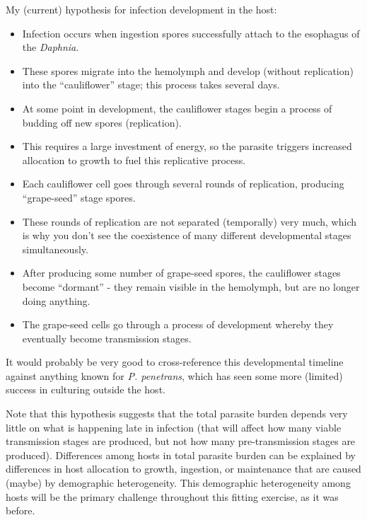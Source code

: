 \documentclass[11pt,reqno,final,pdftex]{amsart}\usepackage[]{graphicx}\usepackage[]{color}
\theoremstyle{plain}
\numberwithin{equation}{part}
\begin{document}
My (current) hypothesis for infection development in the host:
\begin{itemize}
\item Infection occurs when ingestion spores successfully attach to the esophagus of the \emph{Daphnia}.
\item These spores migrate into the hemolymph and develop (without replication) into the ``cauliflower'' stage; this process takes several days.
\item At some point in development, the cauliflower stages begin a process of budding off new spores (replication).
\item This requires a large investment of energy, so the parasite triggers increased allocation to growth to fuel this replicative process.
\item Each cauliflower cell goes through several rounds of replication, producing ``grape-seed'' stage spores.
\item These rounds of replication are not separated (temporally) very much, which is why you don't see the coexistence of many different developmental stages simultaneously.
\item After producing some number of grape-seed spores, the cauliflower stages become ``dormant'' - they remain visible in the hemolymph, but are no longer doing anything.
\item The grape-seed cells go through a process of development whereby they eventually become transmission stages.
\end{itemize}
It would probably be very good to cross-reference this developmental timeline against anything known for \emph{P. penetrans}, which has seen some more (limited) success in culturing outside the host.

Note that this hypothesis suggests that the total parasite burden depends very little on what is happening late in infection (that will affect how many viable transmission stages are produced, but not how many pre-transmission stages are produced).
Differences among hosts in total parasite burden can be explained by differences in host allocation to growth, ingestion, or maintenance that are caused (maybe) by demographic heterogeneity.
This demographic heterogeneity among hosts will be the primary challenge throughout this fitting exercise, as it was before.
\end{document}
